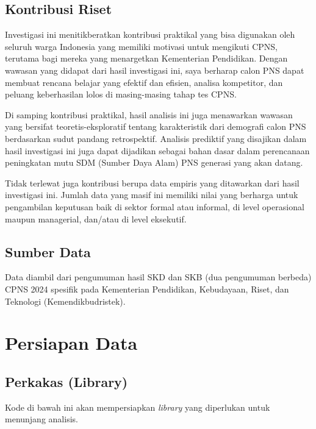 \documentclass[
]{article}
\begin{document}
\subsection{Kontribusi Riset}\label{kontribusi-riset}

Investigasi ini menitikberatkan kontribusi praktikal yang bisa digunakan
oleh seluruh warga Indonesia yang memiliki motivasi untuk mengikuti
CPNS, terutama bagi mereka yang menargetkan Kementerian Pendidikan.
Dengan wawasan yang didapat dari hasil investigasi ini, saya berharap
calon PNS dapat membuat rencana belajar yang efektif dan efisien,
analisa kompetitor, dan peluang keberhasilan lolos di masing-masing
tahap tes CPNS.

Di samping kontribusi praktikal, hasil analisis ini juga menawarkan
wawasan yang bersifat teoretis-eksploratif tentang karakteristik dari
demografi calon PNS berdasarkan sudut pandang retrospektif. Analisis
prediktif yang disajikan dalam hasil investigasi ini juga dapat
dijadikan sebagai bahan dasar dalam perencanaan peningkatan mutu SDM
(Sumber Daya Alam) PNS generasi yang akan datang.

Tidak terlewat juga kontribusi berupa data empiris yang ditawarkan dari
hasil investigasi ini. Jumlah data yang masif ini memiliki nilai yang
berharga untuk pengambilan keputusan baik di sektor formal atau
informal, di level operasional maupun managerial, dan/atau di level
eksekutif.

\subsection{Sumber Data}\label{sumber-data}

Data diambil dari pengumuman hasil SKD dan SKB (dua pengumuman berbeda)
CPNS 2024 spesifik pada Kementerian Pendidikan, Kebudayaan, Riset, dan
Teknologi (Kemendikbudristek).

\section{Persiapan Data}\label{persiapan-data}

\subsection{Perkakas (Library)}\label{perkakas-library}

Kode di bawah ini akan mempersiapkan \emph{library} yang diperlukan
untuk menunjang analisis.
\end{document}
